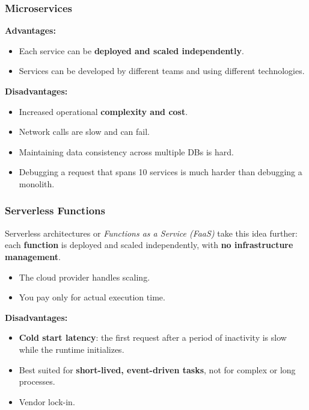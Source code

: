 \documentclass{beamer}
\begin{document}
\begin{frame}
  \frametitle{Microservices}

  \textbf{Advantages:}
  \begin{itemize}
    \item Each service can be \textbf{deployed and scaled independently}.
    \item Services can be developed by different teams and using different technologies.
  \end{itemize}

  \textbf{Disadvantages:}
  \begin{itemize}
    \item Increased operational \textbf{complexity and cost}.
    \item Network calls are slow and can fail.
    \item Maintaining data consistency across multiple DBs is hard.
    \item Debugging a request that spans 10 services is much harder than debugging a monolith.
  \end{itemize}

\end{frame}

\begin{frame}
  \frametitle{Serverless Functions}

  Serverless architectures or \textit{Functions as a Service (FaaS)} take this idea further: each \textbf{function} is deployed and scaled independently, with \textbf{no infrastructure management}.

  \begin{itemize}
    \item The cloud provider handles scaling.
    \item You pay only for actual execution time.
  \end{itemize}

  \textbf{Disadvantages:}
  \begin{itemize}
    \item \textbf{Cold start latency}: the first request after a period of inactivity is slow while the runtime initializes.
    \item Best suited for \textbf{short-lived, event-driven tasks}, not for complex or long processes.
    \item Vendor lock-in.
  \end{itemize}

\end{frame}
\end{document}
